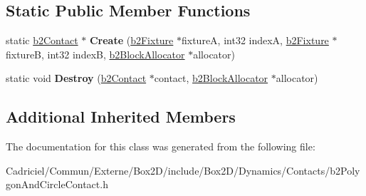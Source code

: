 \subsection*{Static Public Member Functions}
\begin{DoxyCompactItemize}
\item 
static \hyperlink{classb2_contact}{b2\+Contact} $\ast$ {\bfseries Create} (\hyperlink{classb2_fixture}{b2\+Fixture} $\ast$fixtureA, int32 indexA, \hyperlink{classb2_fixture}{b2\+Fixture} $\ast$fixtureB, int32 indexB, \hyperlink{classb2_block_allocator}{b2\+Block\+Allocator} $\ast$allocator)\hypertarget{classb2_polygon_and_circle_contact_a0ff5b8e7167146b5716bce55365b7fc3}{}\label{classb2_polygon_and_circle_contact_a0ff5b8e7167146b5716bce55365b7fc3}

\item 
static void {\bfseries Destroy} (\hyperlink{classb2_contact}{b2\+Contact} $\ast$contact, \hyperlink{classb2_block_allocator}{b2\+Block\+Allocator} $\ast$allocator)\hypertarget{classb2_polygon_and_circle_contact_a666779f20aa3b57cfc0c60e3ac235f6b}{}\label{classb2_polygon_and_circle_contact_a666779f20aa3b57cfc0c60e3ac235f6b}

\end{DoxyCompactItemize}
\subsection*{Additional Inherited Members}


The documentation for this class was generated from the following file\+:\begin{DoxyCompactItemize}
\item 
Cadriciel/\+Commun/\+Externe/\+Box2\+D/include/\+Box2\+D/\+Dynamics/\+Contacts/b2\+Polygon\+And\+Circle\+Contact.\+h\end{DoxyCompactItemize}
